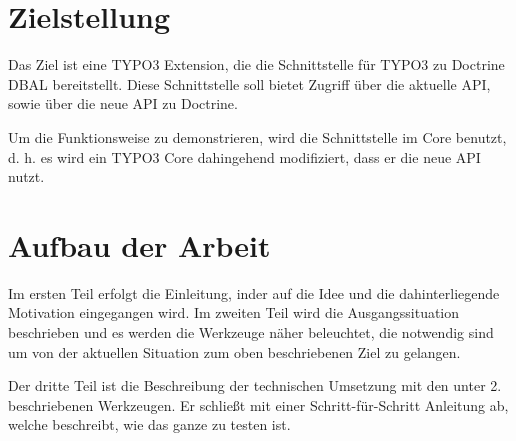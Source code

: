 \section{Zielstellung}
Das Ziel ist eine TYPO3 Extension, die die Schnittstelle für TYPO3 zu Doctrine DBAL bereitstellt. Diese Schnittstelle soll bietet Zugriff über die aktuelle API, sowie über die neue API zu Doctrine.

Um die Funktionsweise zu demonstrieren, wird die Schnittstelle im Core benutzt, d. h. es wird ein TYPO3 Core dahingehend modifiziert, dass er die neue API nutzt.
\section{Aufbau der Arbeit}
Im ersten Teil erfolgt die Einleitung, inder auf die Idee und die dahinterliegende Motivation eingegangen wird. Im zweiten Teil wird die Ausgangssituation beschrieben und es werden die Werkzeuge näher beleuchtet, die notwendig sind um von der aktuellen Situation zum oben beschriebenen Ziel zu gelangen.

Der dritte Teil ist die Beschreibung der technischen Umsetzung mit den unter 2. beschriebenen Werkzeugen. Er schließt mit einer Schritt-für-Schritt Anleitung ab, welche beschreibt, wie das ganze zu testen ist.
